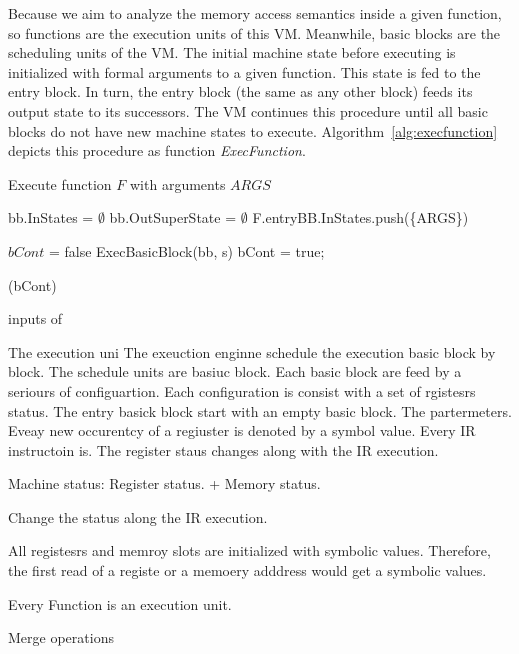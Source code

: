 Because we aim to analyze the memory access semantics inside a given function,
so functions are the execution units of this VM.
Meanwhile, basic blocks are the scheduling units of the VM.
The initial machine state before executing is initialized with formal arguments to a given function.
This state is fed to the entry block. In turn, the entry block (the same as any other block) feeds its output state to its successors.
The VM continues this procedure until all basic blocks do not have new machine states to execute.
Algorithm~\ref{alg:execfunction} depicts this procedure as function \textit{ExecFunction}.

\begin{algorithm}
  \caption{Execute function $F$ with arguments $ARGS$}
  \footnotesize
  \begin{algorithmic}[1]
     
    \State bb.InStates = {$\emptyset$} 
    \State bb.OutSuperState = {$\emptyset$} 
    \EndFor
    \State F.entryBB.InStates.push(\{ARGS\}) 
    \State

    \Do {}

    \State $bCont$ = false
    \State ExecBasicBlock(bb, s)
    \State bCont = true;
    \EndWhile
    \EndFor

    \doWhile(bCont)
    \EndFunction
  \end{algorithmic}
  \label{alg:execfunction}
\end{algorithm}





inputs of

The execution uni
The exeuction enginne schedule the execution basic block by block.
The schedule units are basiuc block.
Each basic block are feed by a seriours of configuartion.
Each configuration is consist with a set of rgistesrs status.
The entry basick block start with an empty basic block.
The partermeters.
Eveay new occurentcy of a regiuster is denoted by a symbol value.
Every IR instructoin is.
The register staus changes along with the IR execution.

Machine status: Register status. + Memory status.

Change the status along the IR execution.

All registesrs and memroy slots are initialized with symbolic values.
Therefore, the first read of a registe or a memoery adddress would get a symbolic values.

Every Function is an execution unit.

Merge operations


